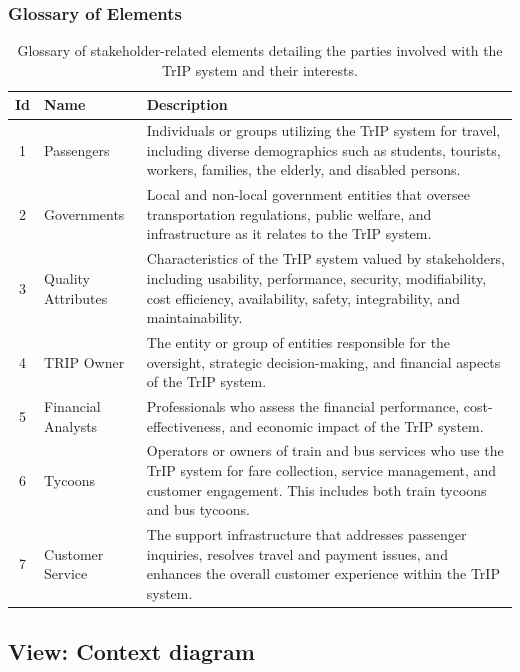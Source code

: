 \subsubsection{Glossary of Elements}
\begin{table}[H]
    \centering
    \begin{tabular}{@{}clp{9cm}@{}}
    \toprule
    \textbf{Id} & \textbf{Name} & \textbf{Description} \\
    \midrule
    1 & Passengers & Individuals or groups utilizing the TrIP system for travel, including diverse demographics such as students, tourists, workers, families, the elderly, and disabled persons. \\
    2 & Governments & Local and non-local government entities that oversee transportation regulations, public welfare, and infrastructure as it relates to the TrIP system. \\
    3 & Quality Attributes & Characteristics of the TrIP system valued by stakeholders, including usability, performance, security, modifiability, cost efficiency, availability, safety, integrability, and maintainability. \\
    4 & TRIP Owner & The entity or group of entities responsible for the oversight, strategic decision-making, and financial aspects of the TrIP system. \\
    5 & Financial Analysts & Professionals who assess the financial performance, cost-effectiveness, and economic impact of the TrIP system. \\
    6 & Tycoons & Operators or owners of train and bus services who use the TrIP system for fare collection, service management, and customer engagement. This includes both train tycoons and bus tycoons. \\
    7 & Customer Service & The support infrastructure that addresses passenger inquiries, resolves travel and payment issues, and enhances the overall customer experience within the TrIP system. \\
    \bottomrule
    \end{tabular}
    \caption{Glossary of stakeholder-related elements detailing the parties involved with the TrIP system and their interests.}
    \label{tab:glossary_stakeholder_view}
\end{table}


\subsection{View: Context diagram}

